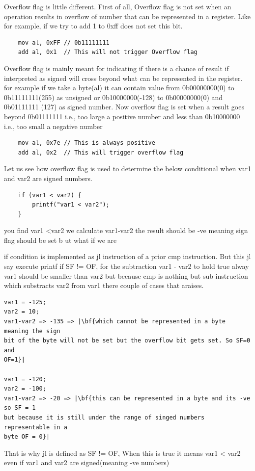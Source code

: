 \documentclass{article}
\begin{document}
Overflow flag is little different. First of all, Overflow flag is not set when
an operation results in overflow of number that can be represented in a
register. Like for example, if we try to add 1 to 0xff does not set this bit.
\begin{verbatim}
    mov al, 0xFF // 0b11111111
    add al, 0x1  // This will not trigger Overflow flag
\end{verbatim}
Overflow flag is mainly meant for indicating if there is a chance of result if
interpreted as signed will cross beyond what can be represented in the register.
for example if we take a byte(al) it can contain value from 0b00000000(0) to
0b11111111(255) as unsigned or 0b10000000(-128) to 0b00000000(0) and 0b01111111
(127) as signed number. Now overflow flag is set when a result goes beyond
0b01111111 i.e., too large a positive number and less than 0b10000000 i.e., too
small a negative number

\begin{verbatim}
    mov al, 0x7e // This is always positive
    add al, 0x2  // This will trigger overflow flag
\end{verbatim}

Let us see how overflow flag is used to determine the below conditional when
var1 and var2 are signed numbers.
\begin{verbatim}
    if (var1 < var2) {
        printf("var1 < var2");
    }
\end{verbatim}
you find var1 \textless var2 we calculate var1-var2 the result should be -ve
meaning sign flag should be set b ut what if we are

if condition is implemented as jl instruction of a prior cmp instruction. But
this jl say execute printf if SF != OF, for the subtraction var1 - var2 to hold
true alway var1 should be smaller than var2 but because cmp is nothing but sub
instruction which substracts var2 from var1 there couple of cases that araises.
\begin{verbatim}
var1 = -125;
var2 = 10;
var1-var2 => -135 => |\bf{which cannot be represented in a byte meaning the sign
bit of the byte will not be set but the overflow bit gets set. So SF=0 and
OF=1}|

var1 = -120;
var2 = -100;
var1-var2 => -20 => |\bf{this can be represented in a byte and its -ve so SF = 1
but because it is still under the range of singed numbers representable in a
byte OF = 0}|
\end{verbatim}
That is why jl is defined as SF != OF, When this is true it means var1 < var2
even if var1 and var2 are signed(meaning -ve numbers)
\end{document}
